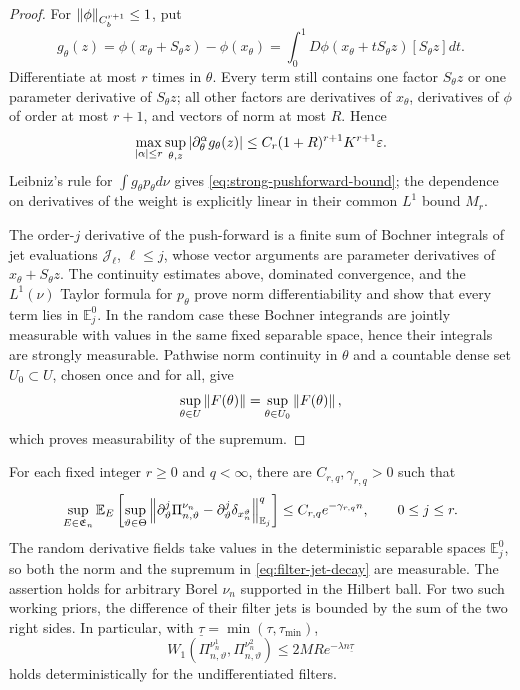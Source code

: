 \begin{proof}
For \(\left\|\phi\right\|_{C_b^{r+1}}\le1\), put
\[
 g_\theta(z)=\phi(x_\theta+S_\theta z)-\phi(x_\theta)
 =\int_0^1D\phi(x_\theta+tS_\theta z)[S_\theta z]dt.
\]
Differentiate at most \(r\) times in \(\theta\).  Every term still contains
one factor \(S_\theta z\) or one parameter derivative of \(S_\theta z\);
all other factors are derivatives of \(x_\theta\), derivatives of \(\phi\)
of order at most \(r+1\), and vectors of norm at most \(R\).  Hence
\[
 \max_{\left|\alpha\right|\le r}\sup_{\theta,z}
 \left|\partial_\theta^\alpha g_\theta(z)\right|
 \le C_r(1+R)^{r+1}K^{r+1}\varepsilon.
\]
Leibniz's rule for \(\int g_\theta p_\theta d\nu\) gives
\eqref{eq:strong-pushforward-bound}; the dependence on derivatives of the
weight is explicitly linear in their common \(L^1\) bound \(M_r\).

The order-\(j\) derivative of the push-forward is a finite sum of Bochner
integrals of jet evaluations \(\mathcal J_\ell\), \(\ell\le j\), whose
vector arguments are parameter derivatives of \(x_\theta+S_\theta z\).
The continuity estimates above, dominated convergence, and the
\(L^1(\nu)\) Taylor formula for \(p_\theta\) prove norm differentiability and
show that every term lies in \(\mathbb E_j^0\).  In the random case these
Bochner integrands are jointly measurable with values in the same fixed
separable space, hence their integrals are strongly measurable.  Pathwise
norm continuity in \(\theta\) and a countable dense set \(U_0\subset U\),
chosen once and for all, give
\[
 \sup_{\theta\in U}\left\|F(\theta)\right\|
 =\sup_{\theta\in U_0}\left\|F(\theta)\right\|,
\]
which proves measurability of the supremum.
\end{proof}

\begin{theorem}
\label{thm:filter-jets}
For each fixed integer \(r\ge0\) and \(q<\infty\), there are
\(C_{r,q},\gamma_{r,q}>0\) such that
\begin{equation}
 \sup_{E\in\mathfrak E_n}
 \mathbb E_E\left[
 \sup_{\vartheta\in\Theta}
 \left\|\partial_\vartheta^j\Pi_{n,\vartheta}^{\nu_n}
       -\partial_\vartheta^j\delta_{x_n^\vartheta}\right\|_{\mathbb E_j}^q
 \right]
 \le C_{r,q}e^{-\gamma_{r,q}n},
 \qquad 0\le j\le r.
 \label{eq:filter-jet-decay}
\end{equation}
The random derivative fields take values in the deterministic separable
spaces \(\mathbb E_j^0\), so both the norm and the supremum in
\eqref{eq:filter-jet-decay} are measurable.  The assertion holds for
arbitrary Borel \(\nu_n\) supported in the Hilbert ball.  For two such
working priors, the difference of their filter jets is bounded by the sum of
the two right sides.  In particular, with
\(\underline\tau=\min(\tau,\tau_{\min})\),
\[
 W_1(\Pi_{n,\vartheta}^{\nu_n^1},
     \Pi_{n,\vartheta}^{\nu_n^2})
 \le2MRe^{-\lambda n\underline\tau}
\]
holds deterministically for the undifferentiated filters.
\end{theorem}

